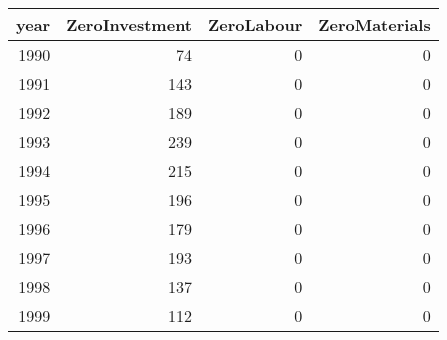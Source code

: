 \begin{tabular}{rrrr}
  \hline
  \textbf{year} & \textbf{ZeroInvestment} & \textbf{ZeroLabour} & \textbf{ZeroMaterials} \\
\hline  1990 & 74 & 0 & 0 \\
  1991 & 143 & 0 & 0 \\
  1992 & 189 & 0 & 0 \\
  1993 & 239 & 0 & 0 \\
  1994 & 215 & 0 & 0 \\
  1995 & 196 & 0 & 0 \\
  1996 & 179 & 0 & 0 \\
  1997 & 193 & 0 & 0 \\
  1998 & 137 & 0 & 0 \\
  1999 & 112 & 0 & 0 \\\hline
\end{tabular}
